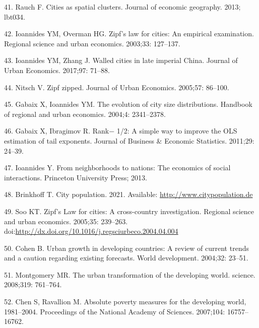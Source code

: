 \documentclass[10pt,letterpaper]{article}
\begin{document}
\leavevmode\hypertarget{ref-rauch_cities_2013}{}%
41. Rauch F. Cities as spatial clusters. Journal of economic geography.
2013; lbt034.

\leavevmode\hypertarget{ref-ioannides_zipfs_2003}{}%
42. Ioannides YM, Overman HG. Zipf's law for cities: An empirical
examination. Regional science and urban economics. 2003;33: 127--137.

\leavevmode\hypertarget{ref-ioannides_walled_2017}{}%
43. Ioannides YM, Zhang J. Walled cities in late imperial China. Journal
of Urban Economics. 2017;97: 71--88.

\leavevmode\hypertarget{ref-nitsch_zipf_2005}{}%
44. Nitsch V. Zipf zipped. Journal of Urban Economics. 2005;57: 86--100.

\leavevmode\hypertarget{ref-gabaix_evolution_2004}{}%
45. Gabaix X, Ioannides YM. The evolution of city size distributions.
Handbook of regional and urban economics. 2004;4: 2341--2378.

\leavevmode\hypertarget{ref-gabaix_rank_2011}{}%
46. Gabaix X, Ibragimov R. Rank− 1/2: A simple way to improve the OLS
estimation of tail exponents. Journal of Business \& Economic
Statistics. 2011;29: 24--39.

\leavevmode\hypertarget{ref-ioannides2013neighborhoods}{}%
47. Ioannides Y. From neighborhoods to nations: The economics of social
interactions. Princeton University Press; 2013.

\leavevmode\hypertarget{ref-citypop}{}%
48. Brinkhoff T. City population. 2021. Available:
\url{http://www.citypopulation.de}

\leavevmode\hypertarget{ref-soo_zipfs_2005}{}%
49. Soo KT. Zipf's Law for cities: A cross-country investigation.
Regional science and urban economics. 2005;35: 239--263.
doi:\href{https://doi.org/http://dx.doi.org/10.1016/j.regsciurbeco.2004.04.004}{http://dx.doi.org/10.1016/j.regsciurbeco.2004.04.004}

\leavevmode\hypertarget{ref-cohen_urban_2004}{}%
50. Cohen B. Urban growth in developing countries: A review of current
trends and a caution regarding existing forecasts. World development.
2004;32: 23--51.

\leavevmode\hypertarget{ref-montgomery_urban_2008}{}%
51. Montgomery MR. The urban transformation of the developing world.
science. 2008;319: 761--764.

\leavevmode\hypertarget{ref-chen_absolute_2007}{}%
52. Chen S, Ravallion M. Absolute poverty measures for the developing
world, 1981--2004. Proceedings of the National Academy of Sciences.
2007;104: 16757--16762.
\end{document}
